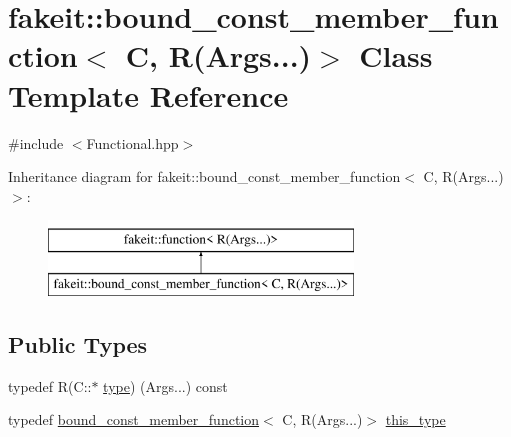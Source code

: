 \hypertarget{classfakeit_1_1bound__const__member__function_3_01C_00_01R_07Args_8_8_8_08_4}{}\section{fakeit\+::bound\+\_\+const\+\_\+member\+\_\+function$<$ C, R(Args...)$>$ Class Template Reference}
\label{classfakeit_1_1bound__const__member__function_3_01C_00_01R_07Args_8_8_8_08_4}


{\ttfamily \#include $<$Functional.\+hpp$>$}

Inheritance diagram for fakeit\+::bound\+\_\+const\+\_\+member\+\_\+function$<$ C, R(Args...)$>$\+:\begin{figure}[H]
\begin{center}
\leavevmode
\includegraphics[height=2.000000cm]{classfakeit_1_1bound__const__member__function_3_01C_00_01R_07Args_8_8_8_08_4}
\end{center}
\end{figure}
\subsection*{Public Types}
\begin{DoxyCompactItemize}
\item 
typedef R(C\+::$\ast$ \mbox{\hyperlink{classfakeit_1_1bound__const__member__function_3_01C_00_01R_07Args_8_8_8_08_4_a0226a7415039666838a9beafb0acc657}{type}}) (Args...) const
\item 
typedef \mbox{\hyperlink{classfakeit_1_1bound__const__member__function}{bound\+\_\+const\+\_\+member\+\_\+function}}$<$ C, R(Args...)$>$ \mbox{\hyperlink{classfakeit_1_1bound__const__member__function_3_01C_00_01R_07Args_8_8_8_08_4_abd7a4a6a7f91724a7279dce10ce7941a}{this\+\_\+type}}
\end{DoxyCompactItemize}
